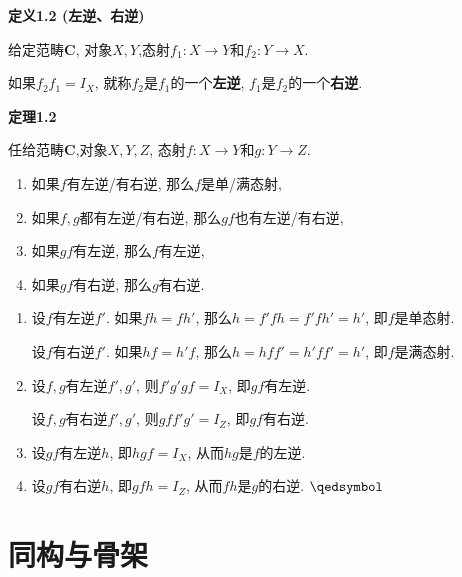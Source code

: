 \documentclass[UTF8]{ctexart}
\begin{document}
\vspace{10pt}

\hypertarget{sec:定义1.2}{}
\noindent\textbf{定义1.2 (左逆、右逆)}

给定范畴$\mathbf{C}$, 对象$X,Y$,态射$f_1:X\to Y$和$f_2:Y\to X$.

如果$f_2f_1=I_X$, 就称$f_2$是$f_1$的一个\textbf{左逆}, $f_1$是$f_2$的一个\textbf{右逆}.

\vspace{10pt}

\hypertarget{sec:定理1.2}{}
\noindent\textbf{定理1.2}

任给范畴$\mathbf{C}$,对象$X,Y,Z$, 态射$f:X\to Y$和$g:Y\to Z$.
\begin{enumerate}
    \item 如果$f$有左逆/有右逆, 那么$f$是单/满态射,
    \item 如果$f,g$都有左逆/有右逆, 那么$gf$也有左逆/有右逆,
    \item 如果$gf$有左逆, 那么$f$有左逆,
    \item 如果$gf$有右逆, 那么$g$有右逆.
\end{enumerate}


\begin{enumerate}
    \item 设$f$有左逆$f'$. 如果$fh=fh'$, 那么$h=f'fh=f'fh'=h'$, 即$f$是单态射.
    
    \hspace{2.17em}
    设$f$有右逆$f'$. 如果$hf=h'f$, 那么$h=hff'=h'ff'=h'$, 即$f$是满态射.

    \item 设$f,g$有左逆$f',g'$, 则$f'g'gf=I_X$, 即$gf$有左逆.
    
    \hspace{2.17em}
    设$f,g$有右逆$f',g'$, 则$gff'g'=I_Z$, 即$gf$有右逆.

    \item 设$gf$有左逆$h$, 即$hgf=I_X$, 从而$hg$是$f$的左逆.
    
    \item 设$gf$有右逆$h$, 即$gfh=I_Z$, 从而$fh$是$g$的右逆. \hfill $\qedsymbol$
\end{enumerate}





\newpage

\section{同构与骨架}
\end{document}
